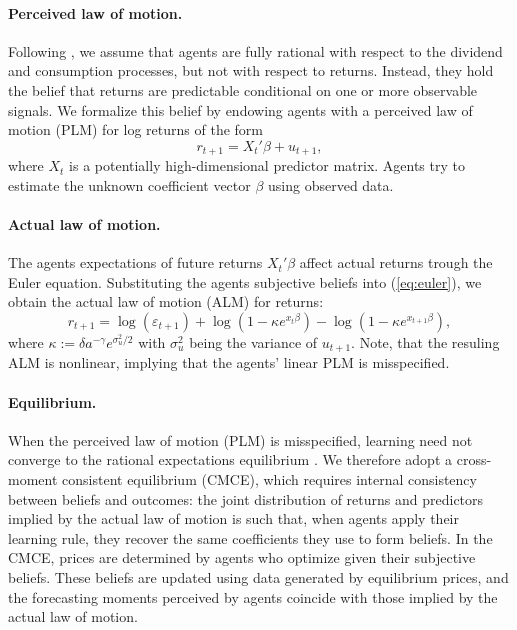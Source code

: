 \documentclass[11pt]{article}
\begin{document}
\paragraph{Perceived law of motion.}
Following \cite{Adam2016}, we assume that agents are fully rational with respect to the dividend and consumption processes, but not with respect to returns. 
Instead, they hold the belief that returns are predictable conditional on one or more observable signals. 
We formalize this belief by endowing agents with a perceived law of motion (PLM) for log returns of the form
\begin{equation}
r_{t+1} = X_t'\beta + u_{t+1},
\end{equation}
where $X_t$ is a potentially high-dimensional predictor matrix.
Agents try to estimate the unknown coefficient vector $\beta$ using observed data.

\paragraph{Actual law of motion.}
The agents expectations of future returns $X_t'\beta$ affect actual returns trough the Euler equation.
Substituting the agents subjective beliefs into (\ref{eq:euler}), we obtain the actual law of motion (ALM) for returns: 
\begin{equation}\label{eq:alm_univariate}
    r_{t+1} = \log(\varepsilon_{t+1}) + \log(1 - \kappa e^{x_{t} \beta}) - \log(1 - \kappa e^{x_{t+1} \beta}),
\end{equation}
where $\kappa := \delta a^{- \gamma} e^{\sigma^2_u / 2}$ with $\sigma^2_u$ being the variance of $u_{t+1}$.
Note, that the resuling ALM is nonlinear, implying that the agents’ linear PLM is misspecified.

\paragraph{Equilibrium.}
When the perceived law of motion (PLM) is misspecified, learning need not converge to the rational expectations equilibrium \citep{Honkapohja2003}. 
We therefore adopt a cross-moment consistent equilibrium (CMCE), which requires internal consistency between beliefs and outcomes: the joint distribution of returns and predictors implied by the actual law of motion is such that, when agents apply their learning rule, they recover the same coefficients they use to form beliefs. 
In the CMCE, prices are determined by agents who optimize given their subjective beliefs.
These beliefs are updated using data generated by equilibrium prices, and the forecasting moments perceived by agents coincide with those implied by the actual law of motion.
\end{document}
